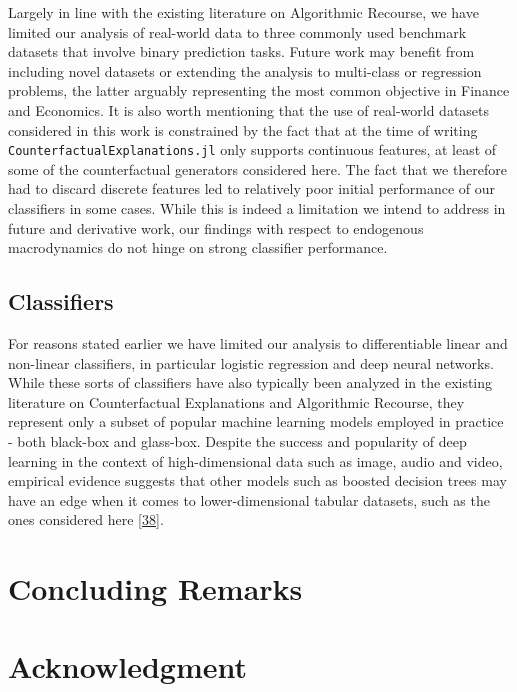 \documentclass[
  conference]{IEEEtran}
\begin{document}
Largely in line with the existing literature on Algorithmic Recourse, we
have limited our analysis of real-world data to three commonly used
benchmark datasets that involve binary prediction tasks. Future work may
benefit from including novel datasets or extending the analysis to
multi-class or regression problems, the latter arguably representing the
most common objective in Finance and Economics. It is also worth
mentioning that the use of real-world datasets considered in this work
is constrained by the fact that at the time of writing
\texttt{CounterfactualExplanations.jl} only supports continuous
features, at least of some of the counterfactual generators considered
here. The fact that we therefore had to discard discrete features led to
relatively poor initial performance of our classifiers in some cases.
While this is indeed a limitation we intend to address in future and
derivative work, our findings with respect to endogenous macrodynamics
do not hinge on strong classifier performance.

\hypertarget{classifiers}{%
\subsection{Classifiers}\label{classifiers}}

For reasons stated earlier we have limited our analysis to
differentiable linear and non-linear classifiers, in particular logistic
regression and deep neural networks. While these sorts of classifiers
have also typically been analyzed in the existing literature on
Counterfactual Explanations and Algorithmic Recourse, they represent
only a subset of popular machine learning models employed in practice -
both black-box and glass-box. Despite the success and popularity of deep
learning in the context of high-dimensional data such as image, audio
and video, empirical evidence suggests that other models such as boosted
decision trees may have an edge when it comes to lower-dimensional
tabular datasets, such as the ones considered here
\protect\hyperlink{ref-grinsztajn2022tree}{{[}38{]}}.

\hypertarget{sec-conclusion}{%
\section{Concluding Remarks}\label{sec-conclusion}}

\hypertarget{acknowledgment}{%
\section*{Acknowledgment}\label{acknowledgment}}
\end{document}
